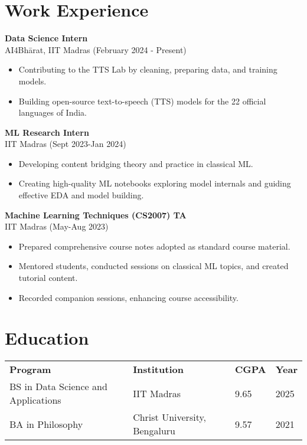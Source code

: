\documentclass[a4paper,10pt]{article}
\begin{document}
\section*{Work Experience}
\textbf{Data Science Intern} \\
AI4Bhārat, IIT Madras (February 2024 - Present)
\begin{itemize}[noitemsep]
    \item Contributing to the TTS Lab by cleaning, preparing data, and training models.
    \item Building open-source text-to-speech (TTS) models for the 22 official languages of India.
\end{itemize}
\textbf{ML Research Intern} \\
IIT Madras (Sept 2023-Jan 2024)
\begin{itemize}[noitemsep]
    \item Developing content bridging theory and practice in classical ML.
    \item Creating high-quality ML notebooks exploring model internals and guiding effective EDA and model building.
\end{itemize}
\textbf{Machine Learning Techniques (CS2007) TA} \\
IIT Madras (May-Aug 2023)
\begin{itemize}[noitemsep]
    \item Prepared comprehensive course notes adopted as standard course material.
    \item Mentored students, conducted sessions on classical ML topics, and created tutorial content.
    \item Recorded companion sessions, enhancing course accessibility.
\end{itemize}

\section*{Education}
\begin{tabular}{llll}
    \textbf{Program} & \textbf{Institution} & \textbf{CGPA} & \textbf{Year} \\
    BS in Data Science and Applications & IIT Madras & 9.65 & 2025 \\
    BA in Philosophy & Christ University, Bengaluru & 9.57 & 2021 \\
\end{tabular}
\end{document}
